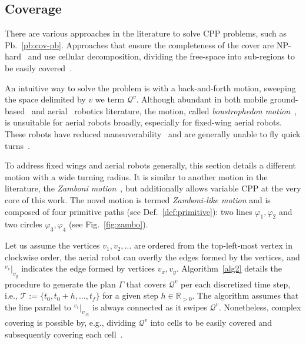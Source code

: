 \documentclass[letterpaper,10pt,journal,twoside]{IEEEtran}
\theoremstyle{definition}
\begin{document}
\subsection{Coverage}
\label{sec:cov-algo}

There are various approaches in the literature to solve CPP problems, such as Pb.~\ref{pb:cov-pb}. Approaches that ensure the completeness of the cover are NP-hard~\cite{arkin2000approximation} and use cellular decomposition, dividing the free-space into sub-regions to be easily covered~\cite{choset2001coverage,galceran2013survey}.

An intuitive way to solve the problem is with a back-and-forth motion, sweeping the space delimited by $v$ we term $\mathcal{Q}^v$. Although abundant in both mobile ground-based~\cite{choset2001coverage,choset2005principles,lavalle2006planning} and aerial~\cite{araujo2013multiple,artemenko2016energy,cabreira2018energy,difranco2015energy} robotics literature, the motion, called \emph{boustrophedon motion}~\cite{choset2001coverage}, is unsuitable for aerial robots broadly, especially for fixed-wing aerial robots. These robots have reduced maneuverability~\cite{dille2013efficient,mannadiar2010optimal,xu2011optimal,xu2014efficient} and are generally unable to fly quick turns~\cite{wang2017curvature}.

To address fixed wings and aerial robots generally, this section details a different motion with a wide turning radius. It is similar to another motion in the literature, the \emph{Zamboni motion}~\cite{araujo2013multiple}, but additionally allows variable CPP at the very core of this work. The novel motion is termed \emph{Zamboni-like motion} and is composed of four primitive paths (see Def.~\ref{def:primitive}): two lines $\varphi_1,\varphi_2$ and two circles $\varphi_3,\varphi_4$ (see Fig.~\ref{fig:zambo}). 

Let us assume the vertices $v_1,v_2,\dots$ are ordered from the top-left-most vertex in clockwise order, the aerial robot can overfly the edges formed by the vertices, and ${}^{v_x}|_{v_y}$ indicates the edge formed by vertices $v_x,v_y$. 
Algorithm~\ref{alg2} details the procedure to generate the plan $\Gamma$ that covers $\mathcal{Q}^v$ per each discretized time step, i.e., $\mathcal{T}:=\{t_0,t_0+h,\dots,t_f\}$ for a given step $h\in\mathbb{R}_{>0}$. The algorithm assumes that the line parallel to ${}^{v_1}|_{v_{|v|}}$ is always connected as it swipes $\mathcal{Q}^{v}$. Nonetheless, complex covering is possible by, e.g., dividing $\mathcal{Q}^{v}$ into cells to be easily covered and subsequently covering each cell~\cite{choset2001coverage}.%
\end{document}
